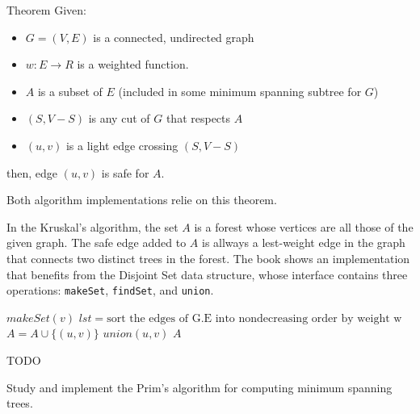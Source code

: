 \begin{frame}
  \begin{block}{Theorem}
    Given:
    \begin{itemize}
      \item $G = (V, E)$ is a connected, undirected graph
      \item $w : E \rightarrow R$ is a weighted function.
      \item $A$ is a subset of $E$ (included in some minimum spanning subtree for $G$)
      \item $(S, V-S)$ is any cut of $G$ that respects $A$
      \item $(u, v)$ is a light edge crossing $(S, V-S)$
    \end{itemize}
    then, edge $(u, v)$ is safe for $A$. 
  \end{block}

  Both algorithm implementations relie on this theorem. 
\end{frame}

\begin{frame}
  In the Kruskal's algorithm, the set $A$ is a {\color{blue}forest}
  whose vertices are all those of the given graph. The safe edge
  added to $A$ is allways a lest-weight edge in the graph that
  connects two distinct trees in the forest. \pause The book
  shows an implementation that benefits from the Disjoint Set
  data structure, whose interface contains three operations:
  \texttt{makeSet}, \texttt{findSet}, and \texttt{union}. 
\end{frame}

\begin{frame}
  \begin{small}
  \begin{algorithmic}
      \State $makeSet(v)$
    \EndFor
    \State $lst = \text{sort the edges of G.E into nondecreasing order by weight w}$
       \State $A = A \cup \{(u, v)\}$
       \State $union(u, v)$
      \EndIf 
    \EndFor
     $A$  
    \EndProcedure
  \end{algorithmic}
  \end{small}
\end{frame}

\begin{frame}{TODO}

  Study and implement the Prim's algorithm for
  computing minimum spanning trees. 
 
\end{frame}

